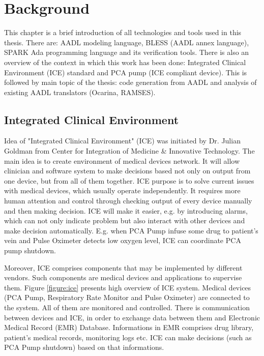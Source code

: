 
\cleardoublepage


\chapter{Background}
\label{background}

This chapter is a brief introduction of all technologies and tools used in this thesis. There are: AADL modeling language, BLESS (AADL annex language), SPARK Ada programming language and its verification tools. There is also an overview of the context in which this work has been done: Integrated Clinical Environment (ICE) standard and PCA pump (ICE compliant device). This is followed by main topic of the thesis: code generation from AADL and analysis of existing AADL translators (Ocarina, RAMSES).



\section{Integrated Clinical Environment}
\label{background:ice}

Idea of "Integrated Clinical Environment" (ICE) was initiated by Dr. Julian Goldman from Center for Integration of Medicine \& Innovative Technology. The main idea is to create environment of medical devices network. It will allow clinician and software system to make decisions based not only on output from one device, but from all of them together. ICE purpose is to solve current issues with medical devices, which usually operate independently. It requires more human attention and control through checking output of every device manually and then making decision. ICE will make it easier, e.g. by introducing alarms, which can not only indicate problem but also interact with other devices and make decision automatically. E.g. when PCA Pump infuse some drug to patient's vein and Pulse Oximeter detects low oxygen level, ICE can coordinate PCA pump shutdown.

Moreover, ICE comprises components that may be implemented by different vendors. Such components are medical devices and applications to supervise them. Figure \ref{figure:ice} presents high overview of ICE system. Medical devices (PCA Pump, Respiratory Rate Monitor and Pulse Oximeter) are connected to the system. All of them are monitored and controlled. There is communication between devices and ICE, in order to exchange data between them and Electronic Medical Record (EMR) Database. Informations in EMR comprises drug library, patient's medical records, monitoring logs etc. ICE can make decisions (such as PCA Pump shutdown) based on that informations.

